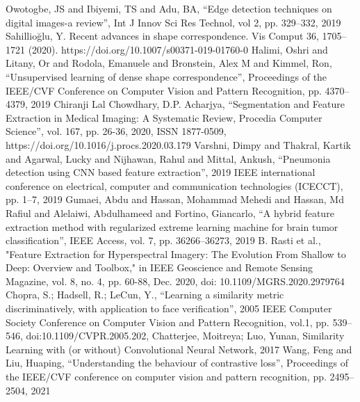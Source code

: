 \documentclass[conference]{IEEEtran}
\begin{document}
\begin{thebibliography}{00}

 Owotogbe, JS and Ibiyemi, TS and Adu, BA, ``Edge detection techniques on digital images-a review'', Int J Innov Sci Res Technol, vol 2, pp. 329--332, 2019
Sahillioğlu, Y. Recent advances in shape correspondence. Vis Comput 36, 1705–1721 (2020). https://doi.org/10.1007/s00371-019-01760-0
 Halimi, Oshri and Litany, Or and Rodola, Emanuele and Bronstein, Alex M and Kimmel, Ron, ``Unsupervised learning of dense shape correspondence'', Proceedings of the IEEE/CVF Conference on Computer Vision and Pattern Recognition, pp. 4370--4379, 2019
 Chiranji Lal Chowdhary, D.P. Acharjya, ``Segmentation and Feature Extraction in Medical Imaging: A Systematic Review, Procedia Computer Science'', vol. 167, pp. 26-36, 2020, ISSN 1877-0509, https://doi.org/10.1016/j.procs.2020.03.179
 Varshni, Dimpy and Thakral, Kartik and Agarwal, Lucky and Nijhawan, Rahul and Mittal, Ankush, ``Pneumonia detection using CNN based feature extraction'', 2019 IEEE international conference on electrical, computer and communication technologies (ICECCT), pp. 1--7, 2019
 Gumaei, Abdu and Hassan, Mohammad Mehedi and Hassan, Md Rafiul and Alelaiwi, Abdulhameed and Fortino, Giancarlo, ``A hybrid feature extraction method with regularized extreme learning machine for brain tumor classification'', IEEE Access, vol. 7, pp. 36266--36273, 2019
 B. Rasti et al., "Feature Extraction for Hyperspectral Imagery: The Evolution From Shallow to Deep: Overview and Toolbox," in IEEE Geoscience and Remote Sensing Magazine, vol. 8, no. 4, pp. 60-88, Dec. 2020, doi: 10.1109/MGRS.2020.2979764
 Chopra, S.; Hadsell, R.; LeCun, Y., ``Learning a similarity metric discriminatively, with application to face verification'', 2005 IEEE Computer Society Conference on Computer Vision and Pattern Recognition, vol.1, pp. 539–546, doi:10.1109/CVPR.2005.202, 
 Chatterjee, Moitreya; Luo, Yunan, Similarity Learning with (or without) Convolutional Neural Network, 2017
 Wang, Feng and Liu, Huaping, ``Understanding the behaviour of contrastive loss'', Proceedings of the IEEE/CVF conference on computer vision and pattern recognition, pp. 2495--2504, 2021


\end{thebibliography}
\vspace{12pt}
\end{document}
